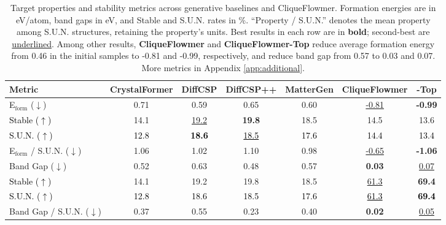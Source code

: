 \documentclass{article}
\theoremstyle{plain}
\theoremstyle{definition}
\theoremstyle{remark}
\begin{document}
\begin{table}[t]
    \centering
    {\small
    \setlength{\tabcolsep}{4pt}
    \begin{tabular}{l|cccc|cc}
        \toprule
        Metric & CrystalFormer & DiffCSP & DiffCSP++ & MatterGen & \textbf{CliqueFlowmer} & \textbf{-Top} \\
        \midrule
        E$_{\text{form}}$ ($\downarrow$) 
        & 0.71 
        & 0.59
        & 0.65 
        & 0.60 
        & \underline{-0.81}
        & \textbf{-0.99} \\
        \textcolor{black}{Stable ($\uparrow$)}
        & 14.1
        & \underline{19.2}
        & \textbf{19.8}
        & 18.5
        & 14.5
        & 13.6 \\
        \textcolor{black}{S.U.N. ($\uparrow$)}  
        & \textcolor{black}{12.8}
        & \textcolor{black}{\textbf{18.6}}
        & \textcolor{black}{\underline{18.5}}
        & \textcolor{black}{17.6}
        & \textcolor{black}{14.4}
        & \textcolor{black}{13.4} \\
        E$_{\text{form}}$ / S.U.N. ($\downarrow$) 
        & 1.06 
        & 1.02 
        & 1.10 
        & 0.98 
        & \underline{-0.65}
        & \textbf{-1.06} \\
        \midrule
        Band Gap ($\downarrow$) 
        & 0.52 
        & 0.63 
        & 0.48 
        & 0.57 
        & \textbf{0.03} 
        & \underline{0.07} \\
        \textcolor{black}{Stable ($\uparrow$)}
        & 14.1
        & 19.2
        & 19.8
        & 18.5
        & \underline{61.3}
        & \textbf{69.4} \\
        \textcolor{black}{S.U.N. ($\uparrow$)}  
        & \textcolor{black}{12.8}
        & \textcolor{black}{18.6}
        & \textcolor{black}{18.5}
        & \textcolor{black}{17.6}
        & \textcolor{black}{\underline{61.3}}
        & \textcolor{black}{\textbf{69.4}} \\
        Band Gap / S.U.N. ($\downarrow$) 
        & 0.37 
        & 0.55 
        & 0.23 
        & 0.40 
        & \textbf{0.02} 
        & \underline{0.05}\\
        \bottomrule
    \end{tabular}
    \caption{\small
    Target properties and stability metrics across generative baselines and CliqueFlowmer. Formation energies are in eV/atom, band gaps in eV, and Stable and S.U.N. rates in \%. ``Property / S.U.N.'' denotes the mean property among S.U.N. structures, retaining the property's units.
    Best results in each row are in \textbf{bold}; second-best are \underline{underlined}.
    Among other results, \textbf{CliqueFlowmer} and \textbf{CliqueFlowmer-Top} reduce average formation energy from 0.46 in the initial samples to -0.81 and -0.99, respectively, and reduce band gap from 0.57 to 0.03 and 0.07. 
    More metrics in Appendix \ref{app:additional}.}
        \label{tab:eform_sun_comparison}
    }
    \vspace{-5pt}
\end{table}
\end{document}
